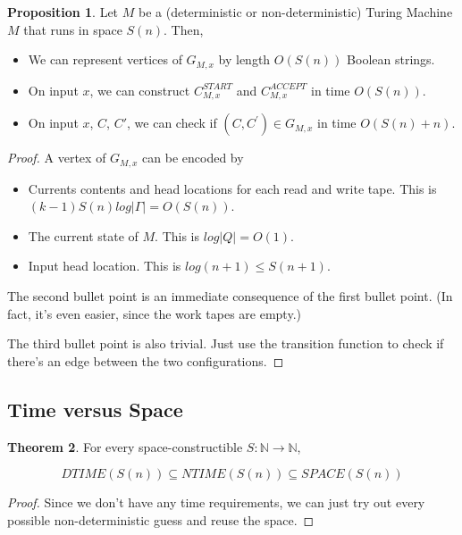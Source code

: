 \documentclass{article}
\theoremstyle{definition}
\newtheorem{theorem}{Theorem}[section]
\newtheorem{proposition}[theorem]{Proposition}
\begin{document}
\begin{proposition}
    Let $M$ be a (deterministic or non-deterministic) Turing Machine $M$ that runs in space $S(n)$. Then,
    \begin{itemize}
        \item We can represent vertices of $G_{M,x}$ by length $O(S(n))$ Boolean strings.
        \item On input $x$, we can construct $C^{START}_{M,x}$ and $C^{ACCEPT}_{M,x}$ in time $O(S(n))$.
        \item On input $x$, $C$, $C{\prime}$, we can check if $(C,C^{\prime}) \in G_{M,x}$ in time $O(S(n) + n)$.
    \end{itemize}
\end{proposition}
\begin{proof}
    A vertex of $G_{M,x}$ can be encoded by 
    \begin{itemize}
        \item Currents contents and head locations for each read and write tape. This is $(k-1)S(n)log\lvert \Gamma \rvert = O(S(n))$.
        \item The current state of $M$. This is $log\lvert Q \rvert = O(1)$.
        \item Input head location. This is $log(n + 1) \leq S(n + 1)$.
    \end{itemize}

    The second bullet point is an immediate consequence of the first bullet point. (In fact, it's even easier, since the work tapes are empty.)

    The third bullet point is also trivial. Just use the transition function to check if there's an edge between the two configurations.
\end{proof}

\subsection{Time versus Space}

\begin{theorem}
    For every space-constructible $S: \mathbb{N} \xrightarrow{} \mathbb{N}$, 

    \[ DTIME(S(n)) \subseteq NTIME(S(n)) \subseteq SPACE(S(n))\]
\end{theorem}
\begin{proof}
    Since we don't have any time requirements, we can just try out every possible non-deterministic guess and reuse the space.
\end{proof}
\end{document}

